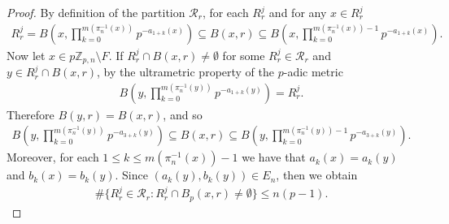 \documentclass[11pt]{amsart}
\theoremstyle{remark}
\numberwithin{equation}{section}
\newcommand{\Z}{\mathbb{Z}}
\begin{document}
\begin{proof}
     By definition of the partition $\mathcal{R}_{r}$, for each $R_{r}^{j}$ and for any $x\in  R_{r}^{j}$
    \begin{align*}
        R_{r}^{j}=B\left(x,\prod_{k=0}^{m(\pi_{n}^{-1}(x))}p^{-a_{1+k}(x)}\right)\subseteq B(x,r) \subseteq B\left(x,\prod_{k=0}^{m(\pi_{n}^{-1}(x))-1}p^{-a_{1+k}(x)}\right).
    \end{align*} Now let $x\in p\Z_{p,n}\setminus F $. If $R_{r}^{j}\cap B(x,r)\neq \emptyset$ for some $R_{r}^{j}\in \mathcal{R}_{r}$ and $y\in R_{r}^{j}\cap B(x,r)$,  by the ultrametric property of the $p$-adic metric 
    \begin{align*}
        B\left(y,\prod_{k=0}^{m(\pi_{n}^{-1}(y))}p^{-a_{1+k}(y)}\right)=R_{r}^{j}.
    \end{align*}Therefore $B(y,r)=B(x,r)$, and so 
    \begin{align*}
        B\left(y,\prod_{k=0}^{m(\pi_{n}^{-1}(y))}p^{-a_{3+k}(y)}\right)\subseteq B(x,r)\subseteq B\left(y,\prod_{k=0}^{m(\pi_{n}^{-1}(y))-1}p^{-a_{3+k}(y)}\right).
    \end{align*}Moreover, for each $1\leq k\leq m(\pi_{n}^{-1}(x))-1$ we have that $a_{k}(x)=a_{k}(y)$ and $b_{k}(x)=b_{k}(y)$. Since $(a_{k}(y),b_{k}(y))\in E_{n}$, then we obtain
    \begin{align*}
        \#\{R_{r}^{j}\in \mathcal{R}_{r}: R_{r}^{j}\cap B_{p}(x,r)\neq \emptyset \}\leq n(p-1).
    \end{align*}
\end{proof}
\end{document}
